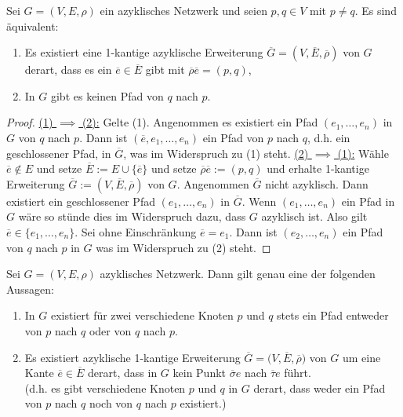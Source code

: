 \begin{lemma}
    Sei $G=(V,E,\rho)$ ein azyklisches Netzwerk und seien $p,q \in V$ mit $p \ne q$.
    Es sind äquivalent:
    \begin{enumerate}[label=(\arabic*)]
        \item Es existiert eine 1-kantige azyklische Erweiterung $\overline{G} = (V,\overline{E}, \overline{\rho})$ von $G$
        derart, dass es ein $\overline{e} \in \overline{E}$ gibt mit $\overline{\rho}\overline{e} = (p,q)$,

        \item  In $G$ gibt es keinen Pfad von $q$ nach $p$.
    \end{enumerate}
\end{lemma}
\begin{proof}
    \underline{(1) $\implies$ (2):} Gelte (1). Angenommen es existiert ein Pfad $(e_1, \ldots,e_n)$ in $G$ von $q$ nach $p$. Dann ist
    $(\overline{e},e_1,\ldots,e_n)$ ein Pfad von $p$ nach $q$, d.h. ein geschlossener Pfad, in $\overline{G}$, was im Widerspruch zu (1) steht.\nl
    \underline{(2) $\implies$ (1):} Wähle $\overline{e} \notin E$ und setze $\overline{E} := E \cup \{\overline{e}\}$ und setze
    $\overline{\rho}\overline{e}:=(p,q)$ und erhalte 1-kantige Erweiterung $\overline{G} := (V, \overline{E}, \overline{\rho})$
    von $G$. Angenommen $\overline{G}$ nicht azyklisch. Dann existiert ein geschlossener Pfad $(e_1, \ldots,e_n)$ in $\overline{G}$.
    Wenn $(e_1, \ldots,e_n)$ ein Pfad in $G$ wäre so stünde dies im Widerspruch dazu, dass $G$ azyklisch ist.
    Also gilt $\overline{e} \in \{e_1, \ldots,e_n\}$. Sei ohne Einschränkung $\overline{e} = e_1$. Dann ist $(e_2, \ldots, e_n)$ ein
    Pfad von $q$ nach $p$ in $G$ was im Widerspruch zu (2) steht.
\end{proof}


\begin{lemma}\label{lemmaAnwendung}
Sei $G=(V,E,\rho)$ azyklisches Netzwerk. Dann gilt genau eine der folgenden Aussagen:
	\begin{enumerate}[label=(\roman*)]
		\item In $G$ existiert für zwei verschiedene Knoten $p$ und $q$ stets ein Pfad entweder von $p$ nach $q$ oder von $q$ nach $p$.
		\item Es existiert azyklische 1-kantige Erweiterung $\overline{G}=\big(V,\overline{E},\overline{\rho}\big)$ von $G$ um eine Kante $\overline{e}\in\overline{E}$ derart, dass in  $G$ kein Punkt $\overline{\sigma}e$ nach $\overline{\tau}e$ führt.\\
		(d.h. es gibt verschiedene Knoten $p$ und $q$ in $G$ derart, dass weder ein Pfad von $p$ nach $q$ noch von $q$ nach $p$ existiert.)
	\end{enumerate}
\end{lemma}

